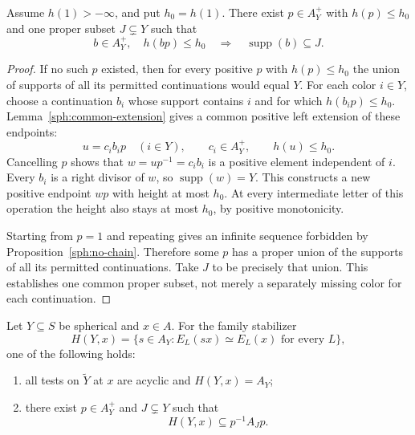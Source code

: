 \begin{lemma}\label{sph:proper-support}
Assume \(h(1)>-\infty\), and put \(h_0=h(1)\).
There exist \(p\in A_Y^+\) with \(h(p)\leq h_0\)
and one proper subset \(J\subsetneq Y\) such that
\[
 b\in A_Y^+,\quad h(bp)\leq h_0
       \quad\Longrightarrow\quad
       \operatorname{supp}(b)\subseteq J.
\]
\end{lemma}

\begin{proof}
If no such \(p\) existed, then for every positive
\(p\) with \(h(p)\leq h_0\) the union of supports
of all its permitted continuations would equal
\(Y\).
For each color \(i\in Y\), choose a continuation
\(b_i\) whose support contains \(i\) and for which
\(h(b_i p)\leq h_0\).
Lemma~\ref{sph:common-extension} gives a common
positive left extension of these endpoints:
\[
 u=c_i b_i p\quad(i\in Y),\qquad
 c_i\in A_Y^+,\qquad h(u)\leq h_0.
\]
Cancelling \(p\) shows that \(w=up^{-1}=c_i b_i\)
is a positive element independent of \(i\).
Every \(b_i\) is a right divisor of \(w\), so
\(\operatorname{supp}(w)=Y\).
This constructs a new positive endpoint \(wp\)
with height at most \(h_0\).
At every intermediate letter of this operation
the height also stays at most \(h_0\), by positive
monotonicity.

Starting from \(p=1\) and repeating gives an
infinite sequence forbidden by
Proposition~\ref{sph:no-chain}.
Therefore some \(p\) has a proper union of the
supports of all its permitted continuations.
Take \(J\) to be precisely that union.
This establishes one common proper subset,
not merely a separately missing color for
each continuation.
\end{proof}

\begin{proposition}\label{sph:containment}
Let \(Y\subseteq S\) be spherical and \(x\in A\).
For the family stabilizer
\[
 H(Y,x)=\{s\in A_Y:E_L(sx)\simeq E_L(x)
                         \text{ for every }L\},
\]
one of the following holds:
\begin{enumerate}
 \item all tests on \(\widetilde Y\) at \(x\)
       are acyclic and \(H(Y,x)=A_Y\);
 \item there exist \(p\in A_Y^+\) and
       \(J\subsetneq Y\) such that
       \begin{equation}\label{sph:eq:containment}
        H(Y,x)\subseteq p^{-1}A_Jp .
       \end{equation}
\end{enumerate}
\end{proposition}

